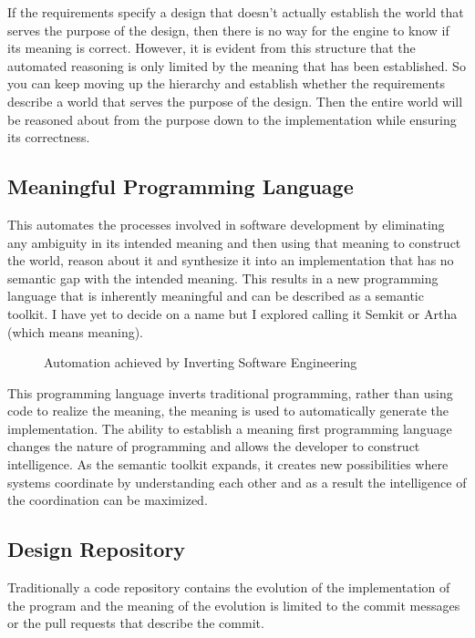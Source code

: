 If the requirements specify a design that doesn't actually establish the world that serves the purpose of the design, then there is no way for the engine to know if its meaning is correct. However, it is evident from this structure that the automated reasoning is only limited by the meaning that has been established. So you can keep moving up the hierarchy and establish whether the requirements describe a world that serves the purpose of the design. Then the entire world will be reasoned about from the purpose down to the implementation while ensuring its correctness.

\subsection{Meaningful Programming Language}

This automates the processes involved in software development by eliminating any ambiguity in its intended meaning and then using that meaning to construct the world, reason about it and synthesize it into an implementation that has no semantic gap with the intended meaning. This results in a new programming language that is inherently meaningful and can be described as a semantic toolkit. I have yet to decide on a name but I explored calling it Semkit or Artha (which means meaning). 

\begin{figure}[htbp]
    \centering
    
    \caption{Automation achieved by Inverting Software Engineering}
    \label{fig:inverted_swe}
\end{figure}

This programming language inverts traditional programming, rather than using code to realize the meaning, the meaning is used to automatically generate the implementation. The ability to establish a meaning first programming language changes the nature of programming and allows the developer to construct intelligence. As the semantic toolkit expands, it creates new possibilities where systems coordinate by understanding each other and as a result the intelligence of the coordination can be maximized.

\subsection{Design Repository}

Traditionally a code repository contains the evolution of the implementation of the program and the meaning of the evolution is limited to the commit messages or the pull requests that describe the commit. 

